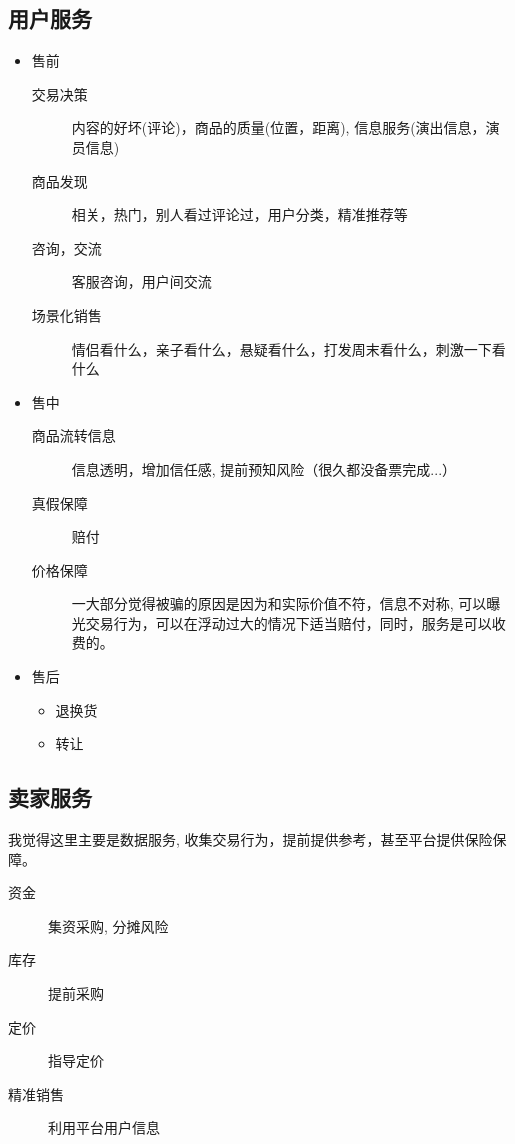 \documentclass[11pt,a4paper]{article}
\begin{document}
\subsection*{用户服务}
\label{sec:orgheadline6}
\begin{itemize}
\item 售前
\begin{description}
\item[{交易决策}] 内容的好坏(评论)，商品的质量(位置，距离), 信息服务(演出信息，演员信息)
\item[{商品发现}] 相关，热门，别人看过评论过，用户分类，精准推荐等
\item[{咨询，交流}] 客服咨询，用户间交流
\item[{场景化销售}] 情侣看什么，亲子看什么，悬疑看什么，打发周末看什么，刺激一下看什么
\end{description}

\item 售中
\begin{description}
\item[{商品流转信息}] 信息透明，增加信任感, 提前预知风险（很久都没备票完成...）
\item[{真假保障}] 赔付
\item[{价格保障}] 一大部分觉得被骗的原因是因为和实际价值不符，信息不对称, 可以曝光交易行为，可以在浮动过大的情况下适当赔付，同时，服务是可以收费的。
\end{description}

\item 售后
\begin{itemize}
\item 退换货
\item 转让
\end{itemize}
\end{itemize}

\subsection*{卖家服务}
\label{sec:orgheadline7}

我觉得这里主要是数据服务, 收集交易行为，提前提供参考，甚至平台提供保险保障。

\begin{description}
\item[{资金}] 集资采购, 分摊风险
\item[{库存}] 提前采购
\item[{定价}] 指导定价
\item[{精准销售}] 利用平台用户信息
\end{description}
\end{document}
